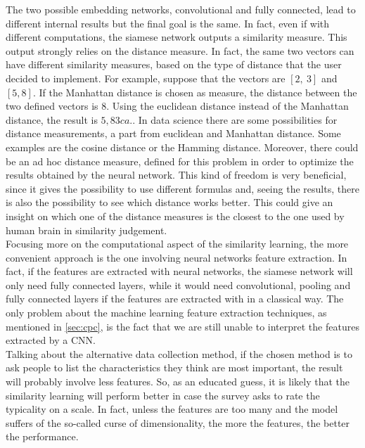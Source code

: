 \documentclass[conference]{IEEEtran}
\begin{document}
			\noindent The two possible embedding networks, convolutional and fully connected, lead to different internal results but the final goal is the same. In fact, even if with different computations, the siamese 
			network outputs a similarity measure. This output strongly relies on the distance measure. In fact, the same two vectors can have different similarity measures, based on the type of distance that the user 
			decided to implement. For example, suppose that the vectors are $[2,\ 3]$ and $[5, 8]$. If the Manhattan distance is chosen as measure, the distance between the two defined vectors is $8$. 
			Using the euclidean distance instead of the Manhattan distance, the result is $5,83 ca.$. In data science there are some possibilities for distance measurements, a part from euclidean and Manhattan distance. Some 
			examples are the cosine distance or the Hamming distance. Moreover, there could be an ad hoc distance measure, defined for this problem in order to optimize the results obtained by the neural network. 
			This kind of freedom is very beneficial, since it gives the possibility to use different formulas and, seeing the results, there is also the possibility to see which distance works better. This could give an 
			insight on which one of the distance measures is the closest to the one used by human brain in similarity judgement. \\
			Focusing more on the computational aspect of the similarity learning, the more convenient approach is the one involving neural networks feature extraction. In fact, if the features are extracted with 
			neural networks, the siamese network will only need fully connected layers, while it would need convolutional, pooling and fully connected layers if the features are extracted with in a classical way. 
			The only problem about the machine learning feature extraction techniques, as mentioned in \ref{sec:cpc}, is the fact that we are still unable to interpret the features extracted by a CNN.\\
			Talking about the alternative data collection method, if the chosen method is to ask people to list the characteristics they think are most important, the result will probably involve less features. So, as an 
			educated guess, it is likely that the similarity learning will perform better in case the survey asks to rate the typicality on a scale. In fact, unless the features are too many and the model suffers of the 
			so-called curse of dimensionality, the more the features, the better the performance.
			
\end{document}
